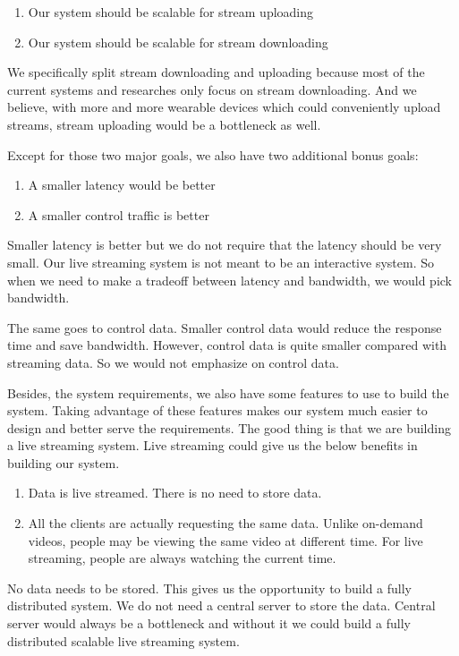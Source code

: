 \documentclass[letterpaper,twocolumn,10pt]{article}
\begin{document}
\begin{enumerate}
  \item Our system should be scalable for stream uploading
  \item Our system should be scalable for stream downloading
\end{enumerate}

We specifically split stream downloading and uploading because most of the current systems and researches only focus on stream downloading. And we believe, with more and more wearable devices which could conveniently upload streams, stream uploading would be a bottleneck as well.

Except for those two major goals, we also have two additional bonus goals:
\begin{enumerate}
  \item A smaller latency would be better
  \item A smaller control traffic is better
\end{enumerate}

Smaller latency is better but we do not require that the latency should be very small. Our live streaming system is not meant to be an interactive system. So when we need to make a tradeoff between latency and bandwidth, we would pick bandwidth. 

The same goes to control data. Smaller control data would reduce the response time and save bandwidth. However, control data is quite smaller compared with streaming data. So we would not emphasize on control data. 

Besides, the system requirements, we also have some features to use to build the system. Taking advantage of these features makes our system much easier to design and better serve the requirements. The good thing is that we are building a live streaming system. Live streaming could give us the below benefits in building our system.

\begin{enumerate}
  \item Data is live streamed. There is no need to store data.
  \item All the clients are actually requesting the same data. Unlike on-demand videos, people may be viewing the same video at different time. For live streaming, people are always watching the current time.
\end{enumerate}

No data needs to be stored. This gives us the opportunity to build a fully distributed system. We do not need a central server to store the data. Central server would always be a bottleneck and without it we could build a fully distributed scalable live streaming system.
\end{document}
